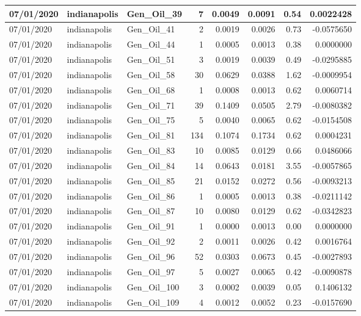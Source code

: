 \documentclass[
  letterpaper,
  DIV=11,
  numbers=noendperiod]{scrartcl}
\begin{document}
\begin{tabular}{l|l|l|r|r|r|r|r}
\hline
07/01/2020 & indianapolis & Gen\_Oil\_39 & 7 & 0.0049 & 0.0091 & 0.54 & 0.0022428\\
\hline
07/01/2020 & indianapolis & Gen\_Oil\_41 & 2 & 0.0019 & 0.0026 & 0.73 & -0.0575650\\
\hline
07/01/2020 & indianapolis & Gen\_Oil\_44 & 1 & 0.0005 & 0.0013 & 0.38 & 0.0000000\\
\hline
07/01/2020 & indianapolis & Gen\_Oil\_51 & 3 & 0.0019 & 0.0039 & 0.49 & -0.0295885\\
\hline
07/01/2020 & indianapolis & Gen\_Oil\_58 & 30 & 0.0629 & 0.0388 & 1.62 & -0.0009954\\
\hline
07/01/2020 & indianapolis & Gen\_Oil\_68 & 1 & 0.0008 & 0.0013 & 0.62 & 0.0060714\\
\hline
07/01/2020 & indianapolis & Gen\_Oil\_71 & 39 & 0.1409 & 0.0505 & 2.79 & -0.0080382\\
\hline
07/01/2020 & indianapolis & Gen\_Oil\_75 & 5 & 0.0040 & 0.0065 & 0.62 & -0.0154508\\
\hline
07/01/2020 & indianapolis & Gen\_Oil\_81 & 134 & 0.1074 & 0.1734 & 0.62 & 0.0004231\\
\hline
07/01/2020 & indianapolis & Gen\_Oil\_83 & 10 & 0.0085 & 0.0129 & 0.66 & 0.0486066\\
\hline
07/01/2020 & indianapolis & Gen\_Oil\_84 & 14 & 0.0643 & 0.0181 & 3.55 & -0.0057865\\
\hline
07/01/2020 & indianapolis & Gen\_Oil\_85 & 21 & 0.0152 & 0.0272 & 0.56 & -0.0093213\\
\hline
07/01/2020 & indianapolis & Gen\_Oil\_86 & 1 & 0.0005 & 0.0013 & 0.38 & -0.0211142\\
\hline
07/01/2020 & indianapolis & Gen\_Oil\_87 & 10 & 0.0080 & 0.0129 & 0.62 & -0.0342823\\
\hline
07/01/2020 & indianapolis & Gen\_Oil\_91 & 1 & 0.0000 & 0.0013 & 0.00 & 0.0000000\\
\hline
07/01/2020 & indianapolis & Gen\_Oil\_92 & 2 & 0.0011 & 0.0026 & 0.42 & 0.0016764\\
\hline
07/01/2020 & indianapolis & Gen\_Oil\_96 & 52 & 0.0303 & 0.0673 & 0.45 & -0.0027893\\
\hline
07/01/2020 & indianapolis & Gen\_Oil\_97 & 5 & 0.0027 & 0.0065 & 0.42 & -0.0090878\\
\hline
07/01/2020 & indianapolis & Gen\_Oil\_100 & 3 & 0.0002 & 0.0039 & 0.05 & 0.1406132\\
\hline
07/01/2020 & indianapolis & Gen\_Oil\_109 & 4 & 0.0012 & 0.0052 & 0.23 & -0.0157690\\

\end{tabular}
\end{document}

